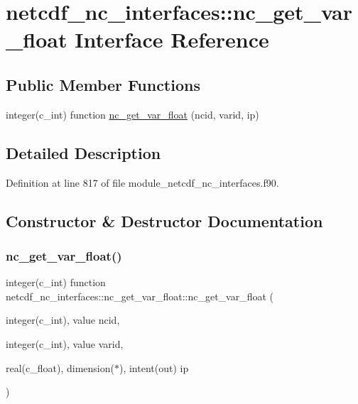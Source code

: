 \hypertarget{interfacenetcdf__nc__interfaces_1_1nc__get__var__float}{}\section{netcdf\+\_\+nc\+\_\+interfaces\+:\+:nc\+\_\+get\+\_\+var\+\_\+float Interface Reference}
\label{interfacenetcdf__nc__interfaces_1_1nc__get__var__float}
\subsection*{Public Member Functions}
\begin{DoxyCompactItemize}
\item 
integer(c\+\_\+int) function \hyperlink{interfacenetcdf__nc__interfaces_1_1nc__get__var__float_a7aad39b9fed6c46740a9d0a6e78e37c6}{nc\+\_\+get\+\_\+var\+\_\+float} (ncid, varid, ip)
\end{DoxyCompactItemize}


\subsection{Detailed Description}


Definition at line 817 of file module\+\_\+netcdf\+\_\+nc\+\_\+interfaces.\+f90.



\subsection{Constructor \& Destructor Documentation}
\mbox{\label{interfacenetcdf__nc__interfaces_1_1nc__get__var__float_a7aad39b9fed6c46740a9d0a6e78e37c6}} 
\subsubsection{\texorpdfstring{nc\+\_\+get\+\_\+var\+\_\+float()}{nc\_get\_var\_float()}}
{\footnotesize\ttfamily integer(c\+\_\+int) function netcdf\+\_\+nc\+\_\+interfaces\+::nc\+\_\+get\+\_\+var\+\_\+float\+::nc\+\_\+get\+\_\+var\+\_\+float (\begin{DoxyParamCaption}\item[{integer(c\+\_\+int), value}]{ncid,  }\item[{integer(c\+\_\+int), value}]{varid,  }\item[{real(c\+\_\+float), dimension($\ast$), intent(out)}]{ip }\end{DoxyParamCaption})}



